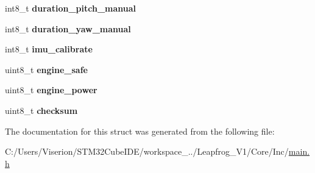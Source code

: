 \begin{DoxyCompactItemize}
int8\+\_\+t {\bfseries duration\+\_\+pitch\+\_\+manual}
\item 
\mbox{\label{struct_s_t_m32_message_ace7968e3ac0cb851f0dbfcb3fbe45f46}} 
int8\+\_\+t {\bfseries duration\+\_\+yaw\+\_\+manual}
\item 
\mbox{\label{struct_s_t_m32_message_a239b4b849923147ceec8da414f2acf18}} 
int8\+\_\+t {\bfseries imu\+\_\+calibrate}
\item 
\mbox{\label{struct_s_t_m32_message_a34a780e875067cc593dc8e2da120dd7b}} 
uint8\+\_\+t {\bfseries engine\+\_\+safe}
\item 
\mbox{\label{struct_s_t_m32_message_a30f0426bf62f2a5d6afc12131bfd9926}} 
uint8\+\_\+t {\bfseries engine\+\_\+power}
\item 
\mbox{\label{struct_s_t_m32_message_a5f306a75c6578959932157047adc09d3}} 
uint8\+\_\+t {\bfseries checksum}
\end{DoxyCompactItemize}


The documentation for this struct was generated from the following file\+:\begin{DoxyCompactItemize}
\item 
C\+:/\+Users/\+Viserion/\+S\+T\+M32\+Cube\+I\+D\+E/workspace\+\_../\+Leapfrog\+\_\+\+V1/\+Core/\+Inc/\mbox{\hyperlink{main_8h}{main.\+h}}\end{DoxyCompactItemize}
